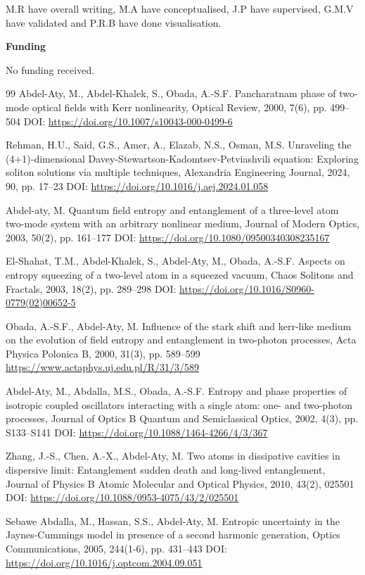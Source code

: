 \documentclass[10pt]{NSP1}
\begin{document}
M.R have overall writing, M.A have conceptualised, J.P have supervised, G.M.V have validated and P.R.B have done visualisation.

\textbf{Funding}

No funding received.

\begin{thebibliography}{99}
 Abdel-Aty, M., Abdel-Khalek, S., Obada, A.-S.F.
Pancharatnam phase of two-mode optical fields with Kerr nonlinearity, Optical Review, 2000, 7(6), pp. 499--504 DOI: \url{https://doi.org/10.1007/s10043-000-0499-6}

 Rehman, H.U., Said, G.S., Amer, A., Elazab, N.S., Osman, M.S.
Unraveling the (4+1)-dimensional Davey-Stewartson-Kadomtsev-Petviashvili equation: Exploring soliton solutions via multiple techniques, Alexandria Engineering Journal, 2024, 90, pp. 17--23 DOI: \url{https://doi.org/10.1016/j.aej.2024.01.058}

 Abdel-aty, M.
Quantum field entropy and entanglement of a three-level atom two-mode system with an arbitrary nonlinear medium, Journal of Modern Optics, 2003, 50(2), pp. 161--177 DOI: \url{https://doi.org/10.1080/09500340308235167}

 El-Shahat, T.M., Abdel-Khalek, S., Abdel-Aty, M., Obada, A.-S.F.
Aspects on entropy squeezing of a two-level atom in a squeezed vacuum, Chaos Solitons and Fractals, 2003, 18(2), pp. 289--298 DOI: \url{https://doi.org/10.1016/S0960-0779(02)00652-5}

 Obada, A.-S.F., Abdel-Aty, M.
Influence of the stark shift and kerr-like medium on the evolution of field entropy and entanglement in two-photon processes, Acta Physica Polonica B, 2000, 31(3), pp. 589--599 \url{https://www.actaphys.uj.edu.pl/R/31/3/589}

 Abdel-Aty, M., Abdalla, M.S., Obada, A.-S.F.
Entropy and phase properties of isotropic coupled oscillators interacting with a single atom: one- and two-photon processes, Journal of Optics B Quantum and Semiclassical Optics, 2002, 4(3), pp. S133--S141 DOI: \url{https://doi.org/10.1088/1464-4266/4/3/367}

 Zhang, J.-S., Chen, A.-X., Abdel-Aty, M.
Two atoms in dissipative cavities in dispersive limit: Entanglement sudden death and long-lived entanglement, Journal of Physics B Atomic Molecular and Optical Physics, 2010, 43(2), 025501 DOI: \url{https://doi.org/10.1088/0953-4075/43/2/025501}

 Sebawe Abdalla, M., Hassan, S.S., Abdel-Aty, M.
Entropic uncertainty in the Jaynes-Cummings model in presence of a second harmonic generation, Optics Communications, 2005, 244(1-6), pp. 431--443 DOI: \url{https://doi.org/10.1016/j.optcom.2004.09.051}


\end{thebibliography}
\end{document}
